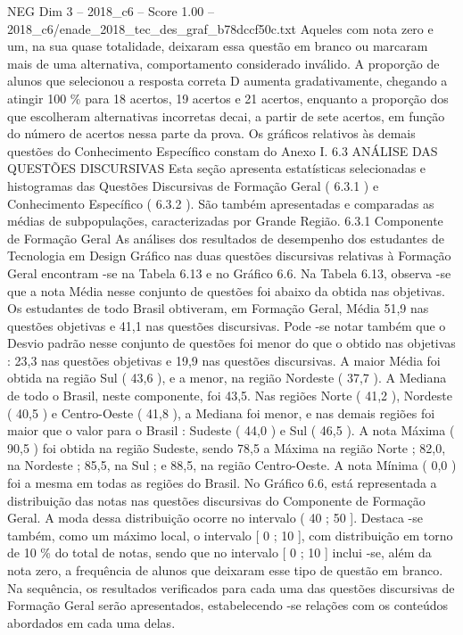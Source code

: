 \begin{textsample}{NEG Dim 3 – 2018\_c6 – Score 1.00 – 2018\_c6/enade\_2018\_tec\_des\_graf\_b78dccf50c.txt}
Aqueles com nota zero e um, na sua quase totalidade, deixaram essa questão em branco ou marcaram mais de uma alternativa, comportamento considerado inválido.
A proporção de alunos que selecionou a resposta correta D aumenta gradativamente, chegando a atingir 100 \% para 18 acertos, 19 acertos e 21 acertos, enquanto a proporção dos que escolheram alternativas incorretas decai, a partir de sete acertos, em função do número de acertos nessa parte da prova.
Os gráficos relativos às demais questões do Conhecimento Específico constam do Anexo I. 6.3 ANÁLISE DAS QUESTÕES DISCURSIVAS Esta seção apresenta estatísticas selecionadas e histogramas das Questões Discursivas de Formação Geral ( 6.3.1 ) e Conhecimento Específico ( 6.3.2 ).
São também apresentadas e comparadas as médias de subpopulações, caracterizadas por Grande Região. 6.3.1 Componente de Formação Geral As análises dos resultados de desempenho dos estudantes de Tecnologia em Design Gráfico nas duas questões discursivas relativas à Formação Geral encontram -se na Tabela 6.13 e no Gráfico 6.6.
Na Tabela 6.13, observa -se que a nota Média nesse conjunto de questões foi abaixo da obtida nas objetivas.
Os estudantes de todo Brasil obtiveram, em Formação Geral, Média 51,9 nas questões objetivas e 41,1 nas questões discursivas.
Pode -se notar também que o Desvio padrão nesse conjunto de questões foi menor do que o obtido nas objetivas : 23,3 nas questões objetivas e 19,9 nas questões discursivas.
A maior Média foi obtida na região Sul ( 43,6 ), e a menor, na região Nordeste ( 37,7 ).
A Mediana de todo o Brasil, neste componente, foi 43,5.
Nas regiões Norte ( 41,2 ), Nordeste ( 40,5 ) e Centro-Oeste ( 41,8 ), a Mediana foi menor, e nas demais regiões foi maior que o valor para o Brasil : Sudeste ( 44,0 ) e Sul ( 46,5 ).
A nota Máxima ( 90,5 ) foi obtida na região Sudeste, sendo 78,5 a Máxima na região Norte ; 82,0, na Nordeste ; 85,5, na Sul ; e 88,5, na região Centro-Oeste.
A nota Mínima ( 0,0 ) foi a mesma em todas as regiões do Brasil.
No Gráfico 6.6, está representada a distribuição das notas nas questões discursivas do Componente de Formação Geral.
A moda dessa distribuição ocorre no intervalo ( 40 ; 50 ].
Destaca -se também, como um máximo local, o intervalo [ 0 ; 10 ], com distribuição em torno de 10 \% do total de notas, sendo que no intervalo [ 0 ; 10 ] inclui -se, além da nota zero, a frequência de alunos que deixaram esse tipo de questão em branco.
Na sequência, os resultados verificados para cada uma das questões discursivas de Formação Geral serão apresentados, estabelecendo -se relações com os conteúdos abordados em cada uma delas.

\end{textsample}
